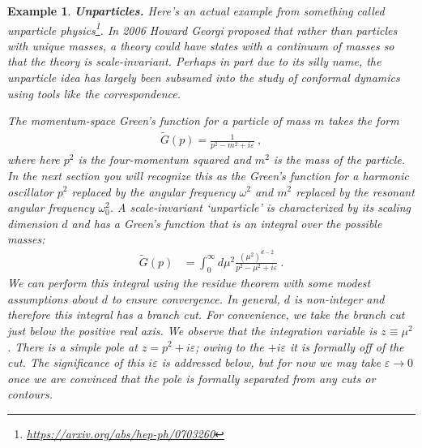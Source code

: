\documentclass[
  11pt,
	colorful,
	raggedright,
]{tufte-style-thesis-flip}
\newtheorem{example}{Example}[section]
\begin{document}
\begin{example} \textbf{Unparticles.}
Here's an actual example from something called \emph{unparticle physics}\footnote{\url{https://arxiv.org/abs/hep-ph/0703260}}. In 2006 Howard Georgi proposed that rather than particles with unique masses, a theory could have states with a continuum of masses so that the theory is scale-invariant. Perhaps in part due to its silly name, the unparticle idea has largely been subsumed into the study of conformal dynamics using tools like the  correspondence.

The momentum-space Green's function for a particle of mass $m$ takes the form
\begin{align}
  \tilde G(p) = \frac{1}{p^2 - m^2 + i\varepsilon} \ ,
\end{align}
where here $p^2$ is the four-momentum squared and $m^2$ is the mass of the particle. In the next section you will recognize this as the Green's function for a harmonic oscillator $p^2$ replaced by the angular frequency $\omega^2$ and $m^2$ replaced by the resonant angular frequency $\omega_0^2$. A scale-invariant `unparticle' is characterized by its scaling dimension $d$ and has a Green's function that is an integral over the possible masses:
\begin{align}
  \tilde G(p) &= \int_0^{\infty} d\mu^2
  \frac{(\mu^2)^{d-2}}{p^2 - \mu^2 + i\varepsilon}
  \ .
\end{align}
We can perform this integral using the residue theorem with some modest assumptions about $d$ to ensure convergence. In general, $d$ is non-integer and therefore this integral has a branch cut. For convenience, we take the branch cut just below the positive real axis.  We observe that the integration variable is $z \equiv \mu^2$. There is a simple pole at $z = p^2+i\varepsilon$; owing to the $+i\varepsilon$ it is formally off of the cut. The significance of this $i\varepsilon$ is addressed below, but for now we may take $\varepsilon\to 0$ once we are convinced that the pole is formally separated from any cuts or contours.


\end{example}
\end{document}

